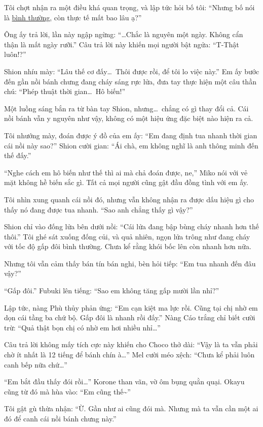 \documentclass[../main.tex]{subfiles}
\begin{document}
Tôi chợt nhận ra một điều khá quan trọng, và lập tức hỏi bố tôi: ``Nhưng bố nói là \uline{bình thường}, còn thực tế mất bao lâu ạ?''

Ông ấy trả lời, lần này ngập ngừng: ``\dots Chắc là nguyên một ngày. Không cẩn thận là mất ngày rưỡi.'' Câu trả lời này khiến mọi người bật ngửa: ``T-Thật luôn!?''

Shion nhíu mày: ``Lâu thế cơ đấy\dots\ Thôi được rồi, để tôi lo việc này.'' Em ấy bước đến gần nồi bánh chưng đang cháy sáng rực lửa, đưa tay thực hiện một câu thần chú: ``Phép thuật thời gian\dots\ Hô biến!''

Một luồng sáng bắn ra từ bàn tay Shion, nhưng\dots\ chẳng có gì thay đổi cả. Cái nồi bánh vẫn y nguyên như vậy, không có một hiệu ứng đặc biệt nào hiện ra cả.

Tôi nhướng mày, đoán được ý đồ của em ấy: ``Em đang định tua nhanh thời gian cái nồi này sao?'' Shion cười gian: ``Ái chà, em không nghĩ là anh thông minh đến thế đấy.''

``Nghe cách em hô biến như thế thì ai mà chả đoán được, ne,'' Miko nói với vẻ mặt không hề biến sắc gì. Tất cả mọi người cũng gật đầu đồng tình với em ấy.

Tôi nhìn xung quanh cái nồi đó, nhưng vẫn không nhận ra được dấu hiệu gì cho thấy nó đang được tua nhanh. ``Sao anh chẳng thấy gì vậy?''

Shion chỉ vào đống lửa bên dưới nồi: ``Cái lửa đang bập bùng cháy nhanh hơn thế thôi.'' Tôi ghé sát xuống đống củi, và quả nhiên, ngọn lửa trông như đang cháy với tốc độ gấp đôi bình thường. Chưa kể rằng khói bốc lên còn nhanh hơn nữa.

Nhưng tôi vẫn cảm thấy bán tín bán nghi, bèn hỏi tiếp: ``Em tua nhanh đến đâu vậy?''

``Gấp đôi.'' Fubuki lên tiếng: ``Sao em không tăng gấp mười lần nhỉ?''

Lập tức, nàng Phù thủy phản ứng: ``Em cạn kiệt ma lực rồi. Cũng tại chị nhờ em dọn cái tầng ba chứ bộ. Gấp đôi là nhanh rồi đấy.'' Nàng Cáo trắng chỉ biết cười trừ: ``Quả thật bọn chị có nhờ em hơi nhiều nhỉ\dots''

Câu trả lời không mấy tích cực này khiến cho Choco thở dài: ``Vậy là ta vẫn phải chờ ít nhất là 12 tiếng để bánh chín à\dots'' Mel cười méo xệch: ``Chưa kể phải luôn canh bếp nữa chứ\dots''

``Em bắt đầu thấy đói rồi\dots'' Korone than vãn, vờ ôm bụng quằn quại. Okayu cũng từ đó mà hùa vào: ``Em cũng thế\~{}''

Tôi gật gù thừa nhận: ``Ừ. Gần như ai cũng đói mà. Nhưng mà ta vẫn cần một ai đó để canh cái nồi bánh chưng này.''
\end{document}
